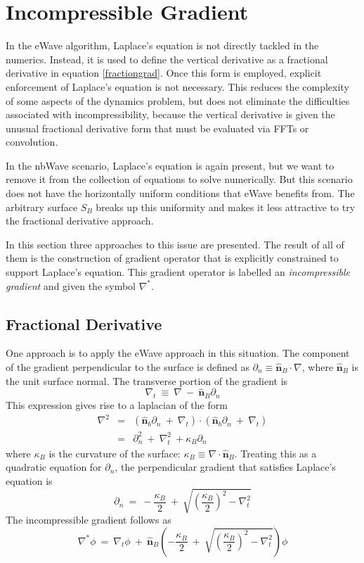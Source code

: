\documentclass{article}
\def\nhat{\hat{\textbf{n}}}
\def\inabla{\nabla^{*}}
\def\tnabla{\nabla_t}
\begin{document}
\section{Incompressible Gradient}\label{igradient}

In the eWave algorithm, Laplace's equation is not directly tackled in the numerics.  Instead, it is used to define the vertical derivative as a fractional derivative in equation \ref{fractiongrad}.  Once this form is employed, explicit enforcement of Laplace's equation is not necessary.  This reduces the complexity of some aspects of the dynamics problem, but does not eliminate the difficulties associated with incompressibility, because the vertical derivative is given the unusual fractional derivative form that must be evaluated via FFTs or convolution.  

In the nbWave scenario, Laplace's equation is again present, but we want to remove it from the collection of equations to solve numerically. But this scenario does not have the horizontally uniform conditions that eWave benefits from.  The arbitrary surface $S_B$ breaks up this uniformity and makes it less attractive to try the fractional derivative approach.  

In this section three approaches to this issue are presented.  The result of all of them is the construction of gradient operator that is explicitly constrained to support Laplace's equation.  This gradient operator is labelled an {\em incompressible gradient} and given the symbol $\inabla$.

\subsection{Fractional Derivative}
One approach is to apply the eWave approach in this situation. The component of the gradient perpendicular to the surface is defined as $\partial_n \equiv \nhat_B\cdot\nabla$, where $\nhat_B$ is the unit surface normal. The transverse portion of the gradient is
\begin{equation}
\tnabla\  \equiv\ \nabla\ -\ \nhat_B\partial_n 
\end{equation}
This expression gives rise to a laplacian of the form
\begin{eqnarray}
\nabla^2 &=& \left( \nhat_b\partial_n \ +\ \tnabla  \right)\cdot \left( \nhat_b\partial_n \ +\ \tnabla  \right) \nonumber \\
&=& \partial_n^2 \ +\ \tnabla^2 \ + \kappa_B \partial_n
\end{eqnarray} 
where $\kappa_B$ is the curvature of the surface: $\kappa_B \equiv \nabla\cdot\nhat_B$.  Treating this as a quadratic equation for $\partial_n$, the perpendicular gradient that satisfies Laplace's equation is
\begin{equation}
\partial_n \ =\ -\frac{\kappa_B}{2}\ +\ \sqrt{ \left(\frac{\kappa_B}{2}\right)^2  - \tnabla^2     }
\end{equation}
The incompressible gradient follows as
\begin{equation}
\inabla\phi \ =\ \tnabla\phi \ + \ \nhat_B \left( -\frac{\kappa_B}{2}\ +\ \sqrt{ \left(\frac{\kappa_B}{2}\right)^2  - \tnabla^2 } \right)\phi
\end{equation}
\end{document}
